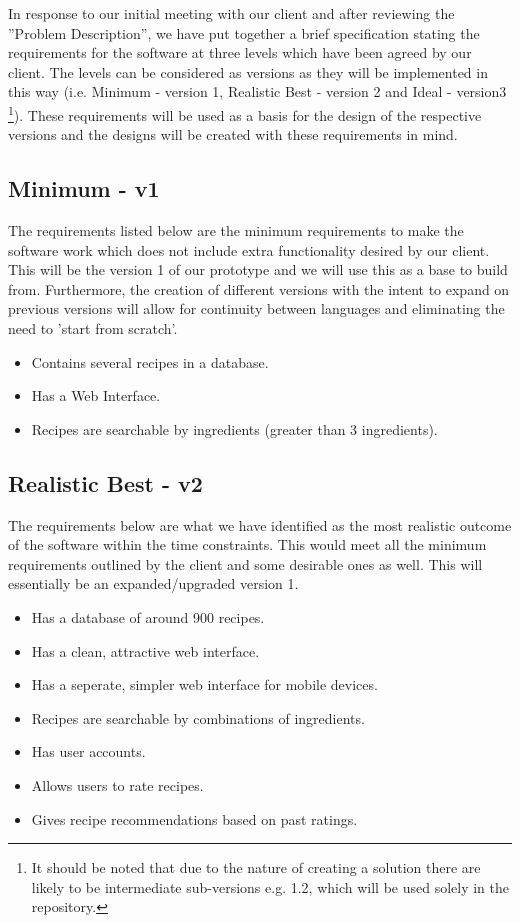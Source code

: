 In response to our initial meeting with our client and after reviewing the ''Problem Description'', we have put together a brief specification stating the requirements for the software at three levels which have been agreed by our client. The levels can be considered as versions as they will be implemented in this way (i.e. Minimum - version 1, Realistic Best -  version 2 and Ideal - version3 \footnote{It should be noted that due to the nature of creating a solution there are likely to be intermediate sub-versions e.g. 1.2, which will be used solely in the repository.}). These requirements will be used as a basis for the design of the respective versions and the designs will be created with these requirements in mind.

\subsection{Minimum - v1}

The requirements listed below are the minimum requirements to make the software work which does not include extra functionality desired by our client. This will be the version 1 of our prototype and we will use this as a base to build from. 
Furthermore, the creation of different versions with the intent to expand on previous versions will allow for continuity between languages and eliminating the need to 'start from scratch'.

\begin{itemize}
	\item Contains several recipes in a database.
	\item Has a Web Interface.
	\item Recipes are searchable by ingredients (greater than 3 ingredients).

\end{itemize}

\subsection{Realistic Best - v2}

The requirements below are what we have identified as the most realistic outcome of the software within the time constraints. This would meet all the minimum requirements outlined by the client and some desirable ones as well. This will essentially be an expanded/upgraded version 1.

\begin{itemize}
	\item Has a database of around 900 recipes. 
	\item Has a clean, attractive web interface.
	\item Has a seperate, simpler web interface for mobile devices.
	\item Recipes are searchable by combinations of ingredients.
	\item Has user accounts.
	\item Allows users to rate recipes.
	\item Gives recipe recommendations based on past ratings.
\end{itemize}

